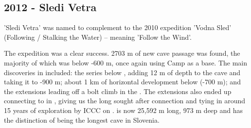 \begin{tcolorbox}
\chapter{2012 - Sledi Vetra}


'Sledi Vetra' was named to complement to the 2010 expedition 'Vodna Sled' (Following / Stalking the Water) -- meaning 'Follow the Wind'.

The expedition was a clear success. 2703 m of new cave passage was
found, the majority of which was below -600 m, once again using Camp
 as a base. The main discoveries in
 included: the  series below
, adding 12 m of depth to the cave and taking it to -900 m;
about 1 km of horizontal development below 
(-700 m); and the  extensions leading off a bolt climb in
the . The  extensions also ended
up connecting to  in , giving us the long
sought after connection and tying in around 15 years of
exploration by ICCC on .  is now 25,592 m long, 973
m deep and has the distinction of being the longest cave in Slovenia.



\end{tcolorbox}
\BgThispage

